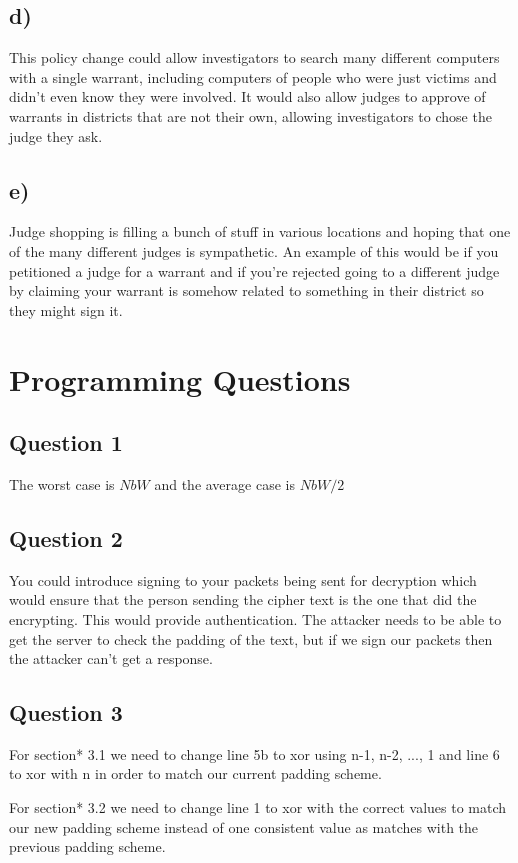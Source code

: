 \documentclass{article}
\begin{document}
\subsection*{d)}
\label{sub:d_}
This policy change could allow investigators to search many different computers with a single warrant, including computers of people who were just victims and didn't even know they were involved. It would also allow judges to approve of warrants in districts that are not their own, allowing investigators to chose the judge they ask.
\subsection*{e)}
\label{sub:e_}
Judge shopping is filling a bunch of stuff in various locations and hoping that one of the many different judges is sympathetic. An example of this would be if you petitioned a judge for a warrant and if you're rejected going to a different judge by claiming your warrant is somehow related to something in their district so they might sign it.



\section*{Programming Questions}
\label{sec:programming_questions}
\subsection*{Question 1}
\label{sub:question_1}
The worst case is $NbW$ and the average case is $NbW/2$

\subsection*{Question 2}
\label{sub:question_2}
You could introduce signing to your packets being sent for decryption which would ensure that the person sending the cipher text is the one that did the encrypting. This would provide authentication. The attacker needs to be able to get the server to check the padding of the text, but if we sign our packets then the attacker can't get a response. 

\subsection*{Question 3}
\label{sub:question_3}
For section* 3.1 we need to change line 5b to xor using n-1, n-2, ..., 1 and line 6 to xor with n in order to match our current padding scheme.

For section* 3.2 we need to change line 1 to xor with the correct values to match our new padding scheme instead of one consistent value as matches with the previous padding scheme.
\end{document}
